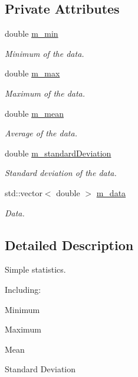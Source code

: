 \subsection*{Private Attributes}
\begin{DoxyCompactItemize}
\item 
double \hyperlink{classcmst_1_1_stat_a2f503d58c0bc9eed8bd6d2c46edffbf4}{m\+\_\+min}
\begin{DoxyCompactList}\small\item\em Minimum of the data. \end{DoxyCompactList}\item 
double \hyperlink{classcmst_1_1_stat_a93f52caf45b449d34c87fcbb0ebaa93e}{m\+\_\+max}
\begin{DoxyCompactList}\small\item\em Maximum of the data. \end{DoxyCompactList}\item 
double \hyperlink{classcmst_1_1_stat_a0fc650572d2cea2bae2190188f3a03cf}{m\+\_\+mean}
\begin{DoxyCompactList}\small\item\em Average of the data. \end{DoxyCompactList}\item 
double \hyperlink{classcmst_1_1_stat_aa6321c420c546603588be13de4628957}{m\+\_\+standard\+Deviation}
\begin{DoxyCompactList}\small\item\em Standard deviation of the data. \end{DoxyCompactList}\item 
std\+::vector$<$ double $>$ \hyperlink{classcmst_1_1_stat_a8c6fad792b12d961df5ea2b091cb39f4}{m\+\_\+data}
\begin{DoxyCompactList}\small\item\em Data. \end{DoxyCompactList}\end{DoxyCompactItemize}


\subsection{Detailed Description}
Simple statistics.

Including\+:
\begin{DoxyItemize}
\item Minimum
\item Maximum
\item Mean
\item Standard Deviation 
\end{DoxyItemize}


